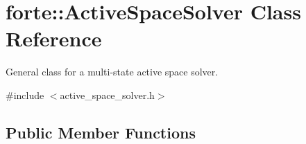 \hypertarget{classforte_1_1_active_space_solver}{}\section{forte\+:\+:Active\+Space\+Solver Class Reference}
\label{classforte_1_1_active_space_solver}


General class for a multi-\/state active space solver.  




{\ttfamily \#include $<$active\+\_\+space\+\_\+solver.\+h$>$}

\subsection*{Public Member Functions}
